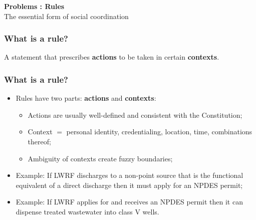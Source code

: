 \documentclass[aspectratio=169]{beamer}
\theoremstyle{principle}
\begin{document}
\begin{frame}

\begin{center}
\Huge\textbf{Problems : Rules}\\
\bigskip
\bigskip
\large The essential form of social coordination
\end{center}

\end{frame}

\begin{frame}
\frametitle{What is a rule?}
\begin{center}
\Large A statement that prescribes \textbf{actions} to be taken in certain \textbf{contexts}.
\end{center}
\end{frame}

\begin{frame}
\frametitle{What is a rule?}

\begin{itemize}
\item Rules have two parts: \textbf{actions} and \textbf{contexts}:
\begin{itemize}
\item Actions are usually well-defined and consistent with the Constitution;
\item Context $=$ personal identity, credentialing, location, time, combinations thereof;
\item Ambiguity of contexts create fuzzy boundaries;
\end{itemize}
\bigskip
\bigskip
\item Example: If LWRF discharges to a non-point source that is the functional equivalent of a direct discharge then it must apply for an NPDES permit;
\bigskip
\bigskip
\item Example: If LWRF applies for and receives an NPDES permit then it can dispense treated wastewater into class V wells.
\end{itemize}
\end{frame}
\end{document}
